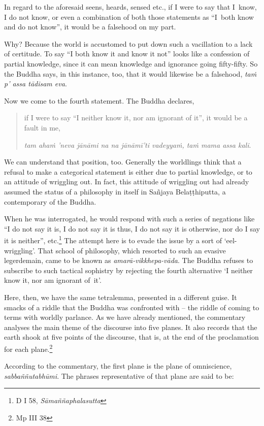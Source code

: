 In regard to the aforesaid seens, heards, sensed etc., if I were to say that I~know, I do not know, or even a combination of both those statements as ``I~both know and do not know'', it would be a falsehood on my part.

Why? Because the world is accustomed to put down such a vacillation to a lack of certitude. To say ``I both know it and know it not'' looks like a confession of partial knowledge, since it can mean knowledge and ignorance going fifty-fifty. So the Buddha says, in this instance, too, that it would likewise be a falsehood, \emph{taṁ p' assa tādisam eva}.

Now we come to the fourth statement. The Buddha declares,

\begin{quote}
if I were to say ``I neither know it, nor am ignorant of it'', it would be a fault in me,

\emph{tam ahaṁ 'neva jānāmi na na jānāmī'ti vadeyyaṁ, taṁ mama assa kali}.
\end{quote}

We can understand that position, too. Generally the worldlings think that a refusal to make a categorical statement is either due to partial knowledge, or to an attitude of wriggling out. In fact, this attitude of wriggling out had already assumed the status of a philosophy in itself in Sañjaya Belaṭṭhiputta, a contemporary of the Buddha.

When he was interrogated, he would respond with such a series of negations like ``I do not say it is, I do not say it is thus, I do not say it is otherwise, nor do I say it is neither'', etc.\footnote{D I 58, \emph{Sāmaññaphalasutta}} The attempt here is to evade the issue by a sort of `eel-wriggling'. That school of philosophy, which resorted to such an evasive legerdemain, came to be known as \emph{amarā-vikkhepa-vāda}. The Buddha refuses to subscribe to such tactical sophistry by rejecting the fourth alternative `I neither know it, nor am ignorant of~it'.

Here, then, we have the same tetralemma, presented in a different guise. It smacks of a riddle that the Buddha was confronted with -- the riddle of coming to terms with worldly parlance. As we have already mentioned, the commentary analyses the main theme of the discourse into five planes. It also records that the earth shook at five points of the discourse, that is, at the end of the proclamation for each plane.\footnote{Mp III 38}

According to the commentary, the first plane is the plane of omniscience, \emph{sabbaññutabhūmi}. The phrases representative of that plane are said to be:

